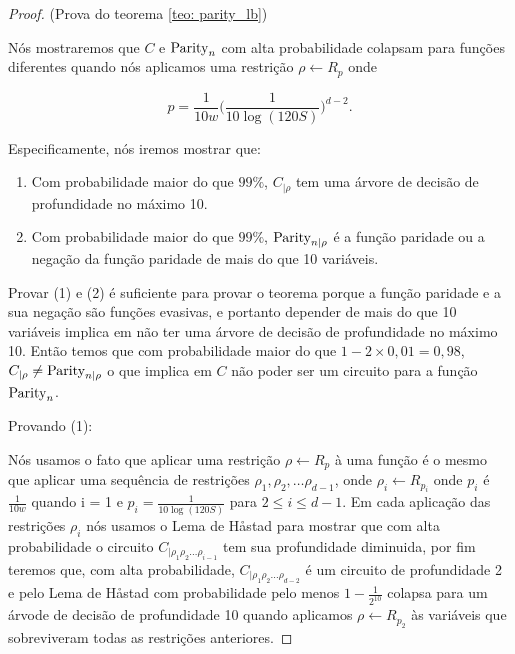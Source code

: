 \begin{proof} (Prova do teorema \ref{teo: parity_lb})

	Nós mostraremos que $C$ e $\text{Parity}_{n}$ com alta probabilidade colapsam para funções diferentes quando nós aplicamos uma restrição $\rho \leftarrow R_{p}$ onde
	
	\begin{equation*}
		p = \frac{1}{10w}\bigg( \frac{1}{10\log(120S)} \bigg)^{d - 2}.
	\end{equation*}

	Especificamente, nós iremos mostrar que:
	
	\begin{enumerate}
	
		\item Com probabilidade maior do que $99\%$, $C_{\lvert \rho}$ tem uma árvore de decisão de profundidade no máximo 10.
	
		\item Com probabilidade maior do que $99\%$, $\text{Parity}_{n \lvert \rho}$ é a função paridade ou a negação da função paridade de mais do que 10 variáveis.
	
	\end{enumerate}

	Provar (1) e (2) é suficiente para provar o teorema porque a função paridade e a sua negação são funções evasivas, e portanto depender de mais do que 10 variáveis implica em não ter uma árvore de decisão de profundidade no máximo 10. Então temos que com probabilidade maior do que $1 - 2 \times 0,01 = 0,98$, $C_{\lvert \rho} \neq \text{Parity}_{n \lvert \rho}$ o que implica em $C$ não poder ser um circuito para a função $\text{Parity}_{n}$. 

	Provando (1):
	
	Nós usamos o fato que aplicar uma restrição $\rho \leftarrow R_{p}$ à uma função é o mesmo que aplicar uma sequência de restrições $\rho_{1}, \rho_{2}, \dots \rho_{d - 1}$, onde $\rho_{i} \leftarrow R_{p_{i}}$ onde $p_{i}$ é $\frac{1}{10w}$ quando i = 1 e $p_{i} = \frac{1}{10 \log(120S)}$ para $2 \leq i \leq d - 1$. Em cada aplicação das restrições $\rho_{i}$ nós usamos o Lema de Håstad para mostrar que com alta probabilidade o circuito $C_{\lvert \rho_{1}\rho_{2}\dots\rho_{i - 1}}$ tem sua profundidade diminuida, por fim teremos que, com alta probabilidade, $C_{\lvert \rho_{1}\rho_{2}\dots\rho_{d - 2}}$ é um circuito de profundidade 2 e pelo Lema de Håstad com probabilidade pelo menos $1 - \frac{1}{2^{10}}$ colapsa para um árvode de decisão de profundidade 10 quando aplicamos $\rho \leftarrow R_{p_{2}}$ às variáveis que sobreviveram todas as restrições anteriores.
	

\end{proof}
